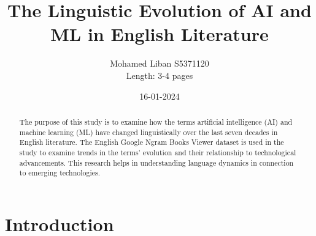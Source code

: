 \documentclass[11pt]{article}
\title{The Linguistic Evolution of AI and ML in English Literature}
\author{Mohamed Liban S5371120\\
Length: 3-4 pages}
\date{16-01-2024}
\begin{document}
\maketitle 

\begin{abstract}
{The purpose of this study is to examine how the terms artificial intelligence (AI) and machine learning (ML) have changed linguistically over the last seven decades in English literature. The English Google Ngram Books Viewer dataset is used in the study to examine trends in the terms' evolution and their relationship to technological advancements. This research helps in understanding language dynamics in connection to emerging technologies.}
\end{abstract}


\section{Introduction}
\end{document}

